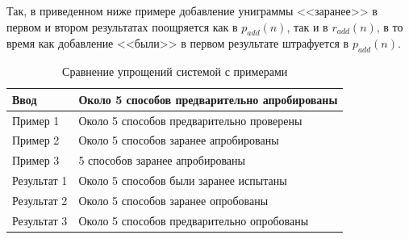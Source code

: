 Так, в приведенном ниже примере добавление униграммы <<заранее>> в первом и втором результатах поощряется как в $p_{add}(n)$, так и в $r_{add}(n)$, в то время как добавление <<были>> в первом результате штрафуется в $p_{add}(n)$.


	\captionsetup{justification=raggedright,singlelinecheck=off}
\begin{table}[h!]
	\centering
	\caption{Сравнение упрощений системой с примерами}
	\label{tabular:example}
	\begin{tabular}{|l|l|}
		\hline
		Ввод        & Около 5 способов предварительно  апробированы \\ \hline
		Пример 1    & Около 5 способов предварительно проверены     \\ \hline
		Пример 2    & Около 5 способов заранее апробированы         \\ \hline
		Пример 3    & 5 способов заранее апробированы               \\ \hline
		Результат 1 & Около 5 способов были заранее испытаны        \\ \hline
		Результат 2 & Около 5 способов заранее опробованы           \\ \hline
		Результат 3 & Около 5 способов предварительно опробованы    \\ \hline
	\end{tabular}
\end{table}


